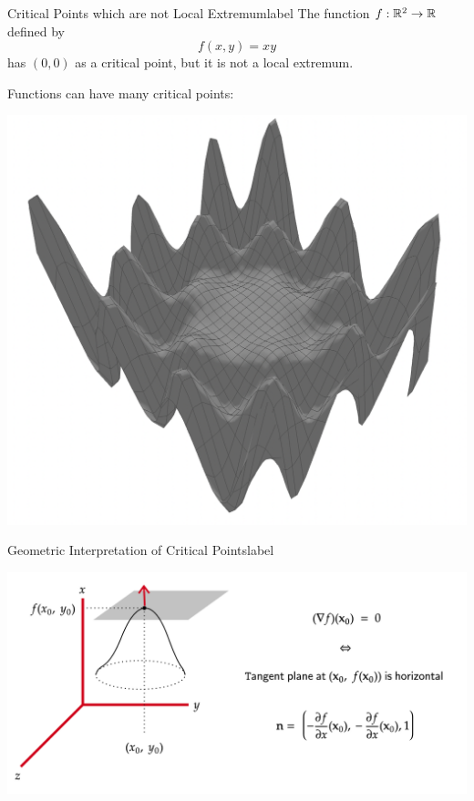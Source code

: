 \begin{ex}{Critical Points which are not Local Extremum}{label}
    The function $f: \mathbb{R}^2 \rightarrow \mathbb{R}$ defined by 
    \[f(x,y) = xy\]
    has $(0,0)$ as a critical point, but it is not a local extremum.
\end{ex}

\begin{marginfigure}
    Functions can have many critical points:
    \begin{center}
        \includegraphics[width=0.7\linewidth]{figures/wk-3/fig-35.png}
    \end{center}
\end{marginfigure}

\begin{ex}{Geometric Interpretation of Critical Points}{label}
    \begin{center}
        \includegraphics[width=\linewidth]{figures/wk-3/fig-37.png}
    \end{center}
\end{ex}

